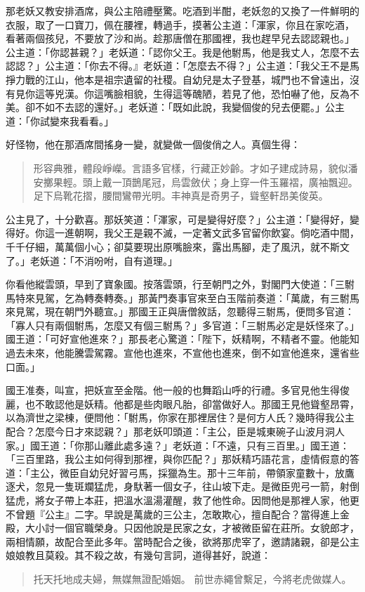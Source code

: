 那老妖又教安排酒席，與公主陪禮壓驚。吃酒到半酣，老妖忽的又換了一件鮮明的衣服，取了一口寶刀，佩在腰裡，轉過手，摸著公主道：「渾家，你且在家吃酒，看著兩個孩兒，不要放了沙和尚。趁那唐僧在那國裡，我也趕早兒去認認親也。」公主道：「你認甚親？」老妖道：「認你父王。我是他駙馬，他是我丈人，怎麼不去認認？」公主道：「你去不得。』老妖道：「怎麼去不得？」公主道：「我父王不是馬掙力戰的江山，他本是祖宗遺留的社稷。自幼兒是太子登基，城門也不曾遠出，沒有見你這等兇漢。你這嘴臉相貌，生得這等醜陋，若見了他，恐怕嚇了他，反為不美。卻不如不去認的還好。」老妖道：「既如此說，我變個俊的兒去便罷。」公主道：「你試變來我看看。」

好怪物，他在那酒席間搖身一變，就變做一個俊俏之人。真個生得：
\begin{quote}
形容典雅，體段崢嶸。言語多官樣，行藏正妙齡。才如子建成詩易，貌似潘安擲果輕。頭上戴一頂鵲尾冠，烏雲斂伏；身上穿一件玉羅褶，廣袖飄迎。足下烏靴花摺，腰間鸞帶光明。丰神真是奇男子，聳壑軒昂美俊英。
\end{quote}

公主見了，十分歡喜。那妖笑道：「渾家，可是變得好麼？」公主道：「變得好，變得好。你這一進朝啊，我父王是親不滅，一定著文武多官留你飲宴。倘吃酒中間，千千仔細，萬萬個小心；卻莫要現出原嘴臉來，露出馬腳，走了風汛，就不斯文了。」老妖道：「不消吩咐，自有道理。」

你看他縱雲頭，早到了寶象國。按落雲頭，行至朝門之外，對閣門大使道：「三駙馬特來見駕，乞為轉奏轉奏。」那黃門奏事官來至白玉階前奏道：「萬歲，有三駙馬來見駕，現在朝門外聽宣。」那國王正與唐僧敘話，忽聽得三駙馬，便問多官道：「寡人只有兩個駙馬，怎麼又有個三駙馬？」多官道：「三駙馬必定是妖怪來了。」國王道：「可好宣他進來？」那長老心驚道：「陛下，妖精啊，不精者不靈。他能知過去未來，他能騰雲駕霧。宣他也進來，不宣他也進來，倒不如宣他進來，還省些口面。」

國王准奏，叫宣，把妖宣至金階。他一般的也舞蹈山呼的行禮。多官見他生得俊麗，也不敢認他是妖精。他都是些肉眼凡胎，卻當做好人。那國王見他聳壑昂霄，以為濟世之梁棟，便問他：「駙馬，你家在那裡居住？是何方人氏？幾時得我公主配合？怎麼今日才來認親？」那老妖叩頭道：「主公，臣是城東碗子山波月洞人家。」國王道：「你那山離此處多遠？」老妖道：「不遠，只有三百里。」國王道：「三百里路，我公主如何得到那裡，與你匹配？」那妖精巧語花言，虛情假意的答道：「主公，微臣自幼兒好習弓馬，採獵為生。那十三年前，帶領家童數十，放鷹逐犬，忽見一隻斑斕猛虎，身馱著一個女子，往山坡下走。是微臣兜弓一箭，射倒猛虎，將女子帶上本莊，把溫水溫湯灌醒，救了他性命。因問他是那裡人家，他更不曾題『公主』二字。早說是萬歲的三公主，怎敢欺心，擅自配合？當得進上金殿，大小討一個官職榮身。只因他說是民家之女，才被微臣留在莊所。女貌郎才，兩相情願，故配合至此多年。當時配合之後，欲將那虎宰了，邀請諸親，卻是公主娘娘教且莫殺。其不殺之故，有幾句言詞，道得甚好，說道：
\begin{quote}
托天托地成夫婦，無媒無證配婚姻。
前世赤繩曾繫足，今將老虎做媒人。
\end{quote}

